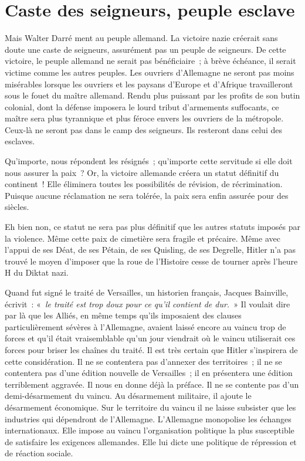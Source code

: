 \documentclass[french,twoside]{book} %
\begin{document}
\section[{Caste des seigneurs, peuple esclave}]{Caste des seigneurs, peuple esclave}
\noindent Mais Walter Darré ment au peuple allemand. La victoire nazie créerait sans doute une caste de seigneurs, assurément pas un peuple de seigneurs. De cette victoire, le peuple allemand ne serait pas bénéficiaire ; à brève échéance, il serait victime comme les autres peuples. Les ouvriers d’Allemagne ne seront pas moins misérables lorsque les ouvriers et les paysans d’Europe et d’Afrique travailleront sous le fouet du maître allemand. Rendu plus puissant par les profits de son butin colonial, dont la défense imposera le lourd tribut d’armements suffocants, ce maître sera plus tyrannique et plus féroce envers les ouvriers de la métropole. Ceux-là ne seront pas dans le camp des seigneurs. Ils resteront dans celui des esclaves.\par
Qu’importe, nous répondent les résignés ; qu’importe cette servitude si elle doit nous assurer la paix ? Or, la victoire allemande créera un statut définitif du continent ! Elle éliminera toutes les possibilités de révision, de récrimination. Puisque aucune réclamation ne sera tolérée, la paix sera enfin assurée pour des siècles.\par
Eh bien non, ce statut ne sera pas plus définitif que les autres statuts imposés par la violence. Même cette paix de cimetière sera fragile et précaire. Même avec l’appui de ses Déat, de ses Pétain, de ses Quisling, de ses Degrelle, Hitler n’a pas trouvé le moyen d’imposer que la roue de l’Histoire cesse de tourner après l’heure H du Diktat nazi.\par
Quand fut signé le traité de Versailles, un historien français, Jacques Bainville, écrivit : « \emph{le traité est trop doux pour ce qu’il contient de dur.} » Il voulait dire par là que les Alliés, en même temps qu’ils imposaient des clauses particulièrement sévères à l’Allemagne, avaient laissé encore au vaincu trop de forces et qu’il était vraisemblable qu’un jour viendrait où le vaincu utiliserait ces forces pour briser les chaînes du traité. Il est très certain que Hitler s’inspirera de cette considération. Il ne se contentera pas d’annexer des territoires ; il ne se contentera pas d’une édition nouvelle de Versailles ; il en présentera une édition terriblement aggravée. Il nous en donne déjà la préface. Il ne se contente pas d’un demi-désarmement du vaincu. Au désarmement militaire, il ajoute le désarmement économique. Sur le territoire du vaincu il ne laisse subsister que les industries qui dépendront de l’Allemagne. L’Allemagne monopolise les échanges internationaux. Elle impose au vaincu l’organisation politique la plus susceptible de satisfaire les exigences allemandes. Elle lui dicte une politique de répression et de réaction sociale.
\end{document}

